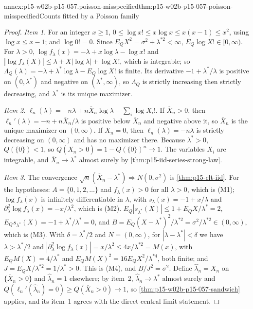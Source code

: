 \begin{annexitem}{annex:p15-w02b-p15-057.poisson-misspecified}{thm:p15-w02b-p15-057-poisson-misspecified}{Counts fitted by a Poisson family}
\begin{proof}
\emph{Item 1.} For an integer \(x\geq1\),
\(0\leq\log x!\leq x\log x\leq x(x-1)\leq x^2\), using \(\log x\leq x-1\);
and \(\log0!=0\). Since \(E_QX^2=\sigma^2+\lambda^{*2}<\infty\),
\(E_Q\log X!\in[0,\infty)\). For \(\lambda>0\),
\(\log f_\lambda(x)=-\lambda+x\log\lambda-\log x!\) and
\(|\log f_\lambda(X)|\leq\lambda+X|\log\lambda|+\log X!\), which is
integrable; so \(\Lambda_Q(\lambda)=-\lambda+\lambda^*\log\lambda-E_Q\log
X!\) is finite. Its derivative \(-1+\lambda^*/\lambda\) is positive on
\((0,\lambda^*)\) and negative on \((\lambda^*,\infty)\), so
\(\Lambda_Q\) is strictly increasing then strictly decreasing, and
\(\lambda^*\) is its unique maximizer.

\emph{Item 2.} \(\ell_n(\lambda)=-n\lambda+n\overline X_n\log\lambda
-\sum_i\log X_i!\). If \(\overline X_n>0\), then
\(\ell_n'(\lambda)=-n+n\overline X_n/\lambda\) is positive below
\(\overline X_n\) and negative above it, so \(\overline X_n\) is the unique
maximizer on \((0,\infty)\). If \(\overline X_n=0\), then
\(\ell_n(\lambda)=-n\lambda\) is strictly decreasing on \((0,\infty)\) and
has no maximizer there. Because \(\lambda^*>0\), \(Q(\{0\})<1\), so
\(Q(\overline X_n>0)=1-Q(\{0\})^n\to1\). The variables \(X_i\) are
integrable, and \(\overline X_n\to\lambda^*\) almost surely by
\cref{thm:p15-iid-series-strong-law}.

\emph{Item 3.} The convergence \(\sqrt n(\overline X_n-\lambda^*)
\Rightarrow N(0,\sigma^2)\) is \cref{thm:p15-clt-iid}. For the
hypotheses: \(A=\{0,1,2,\ldots\}\) and \(f_\lambda(x)>0\) for all
\(\lambda>0\), which is (M1); \(\log f_\lambda(x)\) is infinitely
differentiable in \(\lambda\), with \(s_\lambda(x)=-1+x/\lambda\) and
\(\partial_\lambda^2\log f_\lambda(x)=-x/\lambda^2\), which is (M2).
\(E_Q|s_{\lambda^*}(X)|\leq1+E_QX/\lambda^*=2\),
\(E_Qs_{\lambda^*}(X)=-1+\lambda^*/\lambda^*=0\), and
\(B=E_Q(X-\lambda^*)^2/\lambda^{*2}=\sigma^2/\lambda^{*2}\in(0,\infty)\),
which is (M3). With \(\delta=\lambda^*/2\) and \(N=(0,\infty)\), for
\(|\lambda-\lambda^*|<\delta\) we have \(\lambda>\lambda^*/2\) and
\(|\partial_\lambda^2\log f_\lambda(x)|=x/\lambda^2\leq4x/\lambda^{*2}
=M(x)\), with \(E_QM(X)=4/\lambda^*\) and
\(E_QM(X)^2=16E_QX^2/\lambda^{*4}\), both finite; and
\(J=E_QX/\lambda^{*2}=1/\lambda^*>0\). This is (M4), and
\(B/J^2=\sigma^2\). Define \(\widehat\lambda_n=\overline X_n\) on
\(\{\overline X_n>0\}\) and \(\widehat\lambda_n=1\) elsewhere; by item~2,
\(\widehat\lambda_n\to\lambda^*\) almost surely and
\(Q(\ell_n'(\widehat\lambda_n)=0)\geq Q(\overline X_n>0)\to1\), so
\cref{thm:p15-w02b-p15-057-sandwich} applies, and its item~1 agrees with
the direct central limit statement.


\end{proof}
\end{annexitem}
